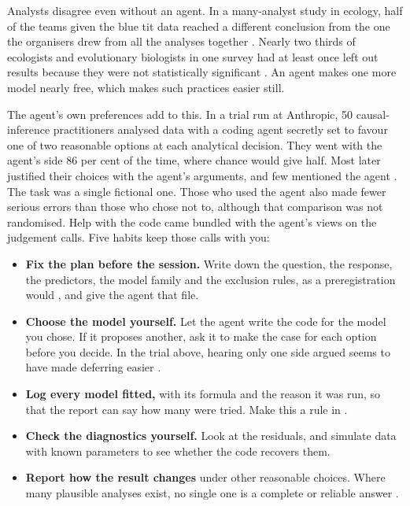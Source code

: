 Analysts disagree even without an agent. In a many-analyst study in ecology,
half of the teams given the blue tit data reached a different conclusion from
the one the organisers drew from all the analyses together
\parencite{gould2025analysts}. Nearly two thirds of ecologists and
evolutionary biologists in one survey had at least once left out results
because they were not statistically significant \parencite{fraser2018qrp}.
An agent makes one more model nearly free, which makes such practices easier
still.

The agent's own preferences add to this. In a trial run at Anthropic, 50
causal-inference practitioners analysed data with a coding agent secretly set
to favour one of two reasonable options at each analytical decision. They
went with the agent's side 86 per cent of the time, where chance would give
half. Most later justified their choices with the agent's arguments, and few
mentioned the agent \parencite{herdagdelen2026aligned}. The task was a single
fictional one. Those who used the agent also made fewer serious errors than
those who chose not to, although that comparison was not randomised. Help
with the code came bundled with the agent's views on the judgement calls.
Five habits keep those calls with you:

\begin{itemize}
  \item \textbf{Fix the plan before the session.} Write down the question,
    the response, the predictors, the model family and the exclusion rules,
    as a preregistration would \parencite{fraser2018qrp}, and give the agent
    that file.
  \item \textbf{Choose the model yourself.} Let the agent write the code for
    the model you chose. If it proposes another, ask it to make the case for
    each option before you decide. In the trial above, hearing only one
    side argued seems to have made deferring easier
    \parencite{herdagdelen2026aligned}.
  \item \textbf{Log every model fitted,} with its formula and the reason it
    was run, so that the report can say how many were tried. Make this a
    rule in .
  \item \textbf{Check the diagnostics yourself.} Look at the residuals, and
    simulate data with known parameters to see whether the code recovers
    them.
  \item \textbf{Report how the result changes} under other reasonable
    choices. Where many plausible analyses exist, no single one is a
    complete or reliable answer \parencite{gould2025analysts}.
\end{itemize}
